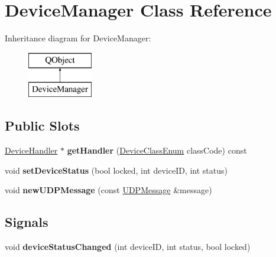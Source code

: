 \hypertarget{class_device_manager}{}\section{Device\+Manager Class Reference}
\label{class_device_manager}
Inheritance diagram for Device\+Manager\+:\begin{figure}[H]
\begin{center}
\leavevmode
\includegraphics[height=2.000000cm]{class_device_manager}
\end{center}
\end{figure}
\subsection*{Public Slots}
\begin{DoxyCompactItemize}
\item 
\mbox{\label{class_device_manager_a693a3a80d7cefeaabbc29fd8695f9e1a}} 
\hyperlink{class_device_handler}{Device\+Handler} $\ast$ {\bfseries get\+Handler} (\hyperlink{_global_defs_8h_ad17679fac69973be9b3a2787a60d7722}{Device\+Class\+Enum} class\+Code) const
\item 
\mbox{\label{class_device_manager_a5587101460d059f50fb3ab4c3992794f}} 
void {\bfseries set\+Device\+Status} (bool locked, int device\+ID, int status)
\item 
\mbox{\label{class_device_manager_aa231eea3b24b3418482506be4b7d02ef}} 
void {\bfseries new\+U\+D\+P\+Message} (const \hyperlink{class_u_d_p_message}{U\+D\+P\+Message} \&message)
\end{DoxyCompactItemize}
\subsection*{Signals}
\begin{DoxyCompactItemize}
\item 
\mbox{\label{class_device_manager_ae2f42b5441dbfa08e94793187079e66a}} 
void {\bfseries device\+Status\+Changed} (int device\+ID, int status, bool locked)
\end{DoxyCompactItemize}
